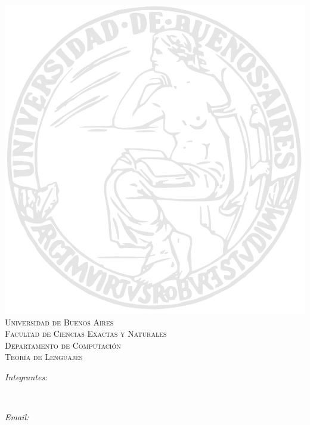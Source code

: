 \documentclass[spanish,12pt]{article}
\author{ Lautaro Alvarez\\ Nicolas Walter\\Ignacio Rodriguez}								%
\date{\today}											%
\makeatletter
\let\theauthor\@author
\makeatother
\begin{document}
\begin{titlepage}

	\begin{center}


   \includegraphics[scale = 0.7]{img/logo_uba.jpg}\\[1.0 cm]	%
    \textsc{\huge Universidad de Buenos Aires}\\[0.5 cm]	%
 \textsc{\large Facultad de Ciencias Exactas y Naturales}\\[0.5 cm]	%
 \textsc{\large Departamento de Computación}\\[1 cm]	%

	\textsc{\Large Teoría de Lenguajes}\\[0.2 cm]				%

	\begin{minipage}{0.4\textwidth}
		\begin{flushleft} \large
			\emph{Integrantes:}\\
            \vspace{2mm}
			\theauthor
			\end{flushleft}
			\end{minipage}~
			\begin{minipage}{0.4\textwidth}
			\begin{flushleft} \large
			\emph{Email:} \\
              \vspace{2mm}


\end{flushleft}
\end{minipage}
\end{center}
\end{titlepage}
\end{document}

